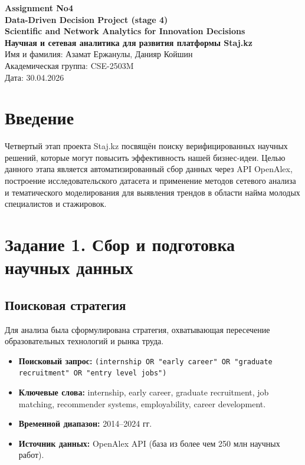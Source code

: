 \documentclass[12pt]{article}
\begin{document}
\begin{center}
    \textbf{Assignment No4} \\
    \textbf{Data-Driven Decision Project (stage 4)} \\
    \textbf{Scientific and Network Analytics for Innovation Decisions} \\
    \vspace{0.5cm}
    \textbf{\Large Научная и сетевая аналитика для развития платформы Staj.kz} \\
    \vspace{0.5cm}
    Имя и фамилия: Азамат Ержанулы, Данияр Койшин \\
    Академическая группа: CSE-2503M \\
    Дата: 30.04.2026
\end{center}

\section*{Введение}
Четвертый этап проекта Staj.kz посвящён поиску верифицированных научных решений, которые могут повысить эффективность нашей бизнес-идеи. Целью данного этапа является автоматизированный сбор данных через API OpenAlex, построение исследовательского датасета и применение методов сетевого анализа и тематического моделирования для выявления трендов в области найма молодых специалистов и стажировок.

\section{Задание 1. Сбор и подготовка научных данных}

\subsection{Поисковая стратегия}
Для анализа была сформулирована стратегия, охватывающая пересечение образовательных технологий и рынка труда.
\begin{itemize}
    \item \textbf{Поисковый запрос:} \texttt{(internship OR "early career" OR "graduate recruitment" OR "entry level jobs")}
    \item \textbf{Ключевые слова:} internship, early career, graduate recruitment, job matching, recommender systems, employability, career development.
    \item \textbf{Временной диапазон:} 2014--2024 гг.
    \item \textbf{Источник данных:} OpenAlex API (база из более чем 250 млн научных работ).
\end{itemize}
\end{document}
